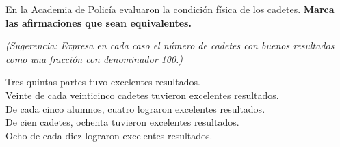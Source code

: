 \question[5] En la Academia de Policía evaluaron la condición física de los cadetes.
\textbf{Marca las afirmaciones que sean equivalentes.}

\emph{(Sugerencia: Expresa en cada caso el número de cadetes con buenos resultados como una fracción
    con denominador 100.)}

\begin{checkboxes}
    \choice Tres quintas partes tuvo excelentes resultados.\\
    \choice Veinte de cada veinticinco cadetes tuvieron excelentes resultados.\\
    \choice De cada cinco alumnos, cuatro lograron excelentes resultados.\\
    \choice De cien cadetes, ochenta tuvieron excelentes resultados.\\
    \choice Ocho de cada diez lograron excelentes resultados.\\
\end{checkboxes}
